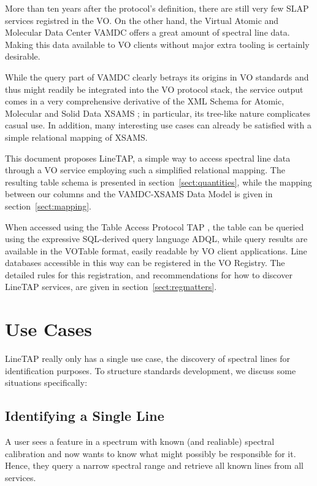 \documentclass[11pt,a4paper]{ivoa}
\begin{document}
More than ten years after the protocol's definition, there are still
very few SLAP services registred in the VO.
On the other hand, the Virtual Atomic and Molecular Data Center
VAMDC offers a great amount of spectral line
data.  Making this data available to VO clients without major extra
tooling is certainly desirable.

While the query part of VAMDC clearly betrays its origins in VO
standards and thus might readily be integrated into the VO protocol
stack, the service output comes in a very comprehensive derivative of
the XML Schema for Atomic, Molecular and Solid Data XSAMS
\citep{XSAMS:Docs}; in particular, its tree-like nature complicates
casual use.  In addition, many interesting use cases can already be
satisfied with a simple relational mapping of XSAMS. 

This document proposes LineTAP, a simple way to access spectral line
data through a VO service employing such a simplified relational
mapping.  The resulting table schema is presented in
section~\ref{sect:quantities}, while the mapping between our columns and the
VAMDC-XSAMS Data Model is given in section~\ref{sect:mapping}.

When accessed using the Table Access Protocol TAP
\citep{2019ivoa.spec.0927D}, the table can be queried using the
expressive SQL-derived query language ADQL, while query results are
available in the VOTable format, easily readable by VO client
applications.  Line databases accessible in this way can be registered
in the VO Registry.  The detailed rules for this registration, and
recommendations for how to discover LineTAP services, are given in
section~\ref{sect:regmatters}.



\section{Use Cases}
\label{sect:use-cases}

LineTAP really only has a single use case, the discovery of spectral
lines for identification purposes.  To structure standards development,
we discuss some situations specifically:

\subsection{Identifying a Single Line}

A user sees a feature in a spectrum with known (and realiable) spectral
calibration and now wants to know what might possibly be responsible for
it.  Hence, they query a narrow spectral range and retrieve all known
lines from all services.
\end{document}
